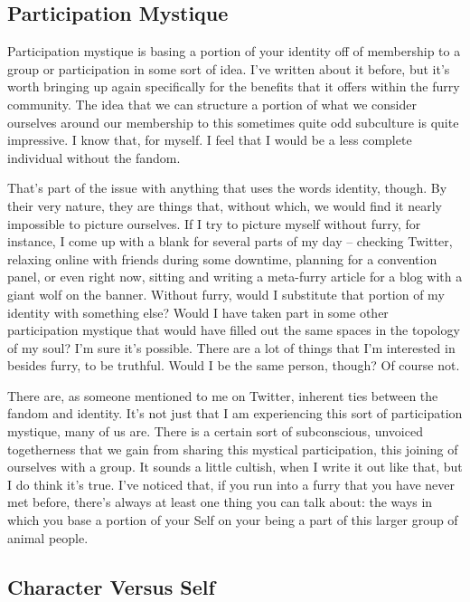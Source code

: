 \subsection*{Participation Mystique}

Participation mystique is basing a portion of your identity off of membership to a group or participation in some sort of idea.  I've written about it before, but it's worth bringing up again specifically for the benefits that it offers within the furry community.  The idea that we can structure a portion of what we consider ourselves around our membership to this sometimes quite odd subculture is quite impressive.  I know that, for myself. I feel that I would be a less complete individual without the fandom.

That's part of the issue with anything that uses the words identity, though.  By their very nature, they are things that, without which, we would find it nearly impossible to picture ourselves.  If I try to picture myself without furry, for instance, I come up with a blank for several parts of my day -- checking Twitter, relaxing online with friends during some downtime, planning for a convention panel, or even right now, sitting and writing a meta-furry article for a blog with a giant wolf on the banner.  Without furry, would I substitute that portion of my identity with something else?  Would I have taken part in some other participation mystique that would have filled out the same spaces in the topology of my soul?  I'm sure it's possible.  There are a lot of things that I'm interested in besides furry, to be truthful.  Would I be the same person, though?  Of course not.

There are, as someone mentioned to me on Twitter, inherent ties between the fandom and identity.  It's not just that I am experiencing this sort of participation mystique, many of us are.  There is a certain sort of subconscious, unvoiced togetherness that we gain from sharing this mystical participation, this joining of ourselves with a group.  It sounds a little cultish, when I write it out like that, but I do think it's true.  I've noticed that, if you run into a furry that you have never met before, there's always at least one thing you can talk about: the ways in which you base a portion of your Self on your being a part of this larger group of animal people.

\subsection*{Character Versus Self}

